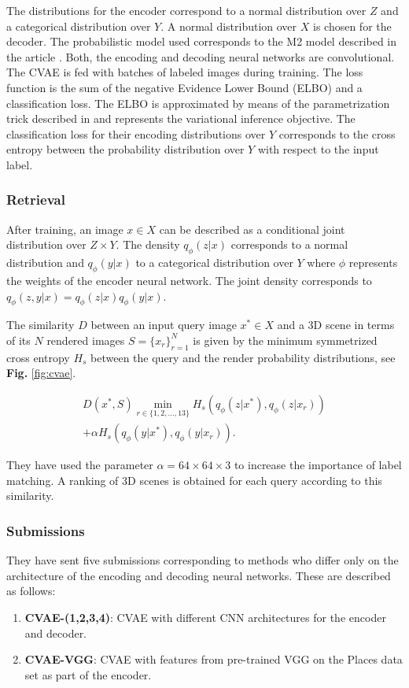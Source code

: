 \documentclass[../main.tex]{subfiles}
\begin{document}
The distributions for the encoder correspond to a normal distribution over $Z$ and a categorical distribution over $Y$. A normal distribution over $X$ is chosen for the decoder. The probabilistic model used corresponds to the M2 model described in the article \cite{Kingma2014a}. Both, the encoding and decoding neural networks are convolutional.\\

The CVAE is fed with batches of labeled images during training. The loss function is the sum of the negative Evidence Lower Bound (ELBO) and a classification loss. The ELBO is approximated by means of the parametrization trick described in \cite{Kingma2014a, kingma2013auto} and represents the variational inference objective. The classification loss for their encoding distributions over $Y$ corresponds to the cross entropy between the probability distribution over $Y$ with respect to the input label. 

\subsubsection{Retrieval}
After training, an image $x\in X$ can be described as a conditional joint distribution over $Z\times Y$. The density $q_\phi(z|x)$ corresponds to a normal distribution and $q_\phi(y|x)$ to a categorical distribution over $Y$ where $\phi$ represents the weights of the encoder neural network. The joint density corresponds to $q_\phi(z,y|x) = q_\phi(z|x) q_\phi(y|x)$.

The similarity $D$ between an input query image $x^*\in X$ and a 3D scene in terms of its $N$ rendered images $S = \{x_r\}_{r=1}^{N}$ is given by the minimum symmetrized cross entropy $H_s$ between the query and the render probability distributions, see \textbf{Fig.} \ref{fig:cvae}.

\begin{multline}
 D(x^*, S)\min_{r\in\{1,2,\ldots,13\} }H_s(q_\phi(z|x^*),q_\phi(z|x_{r}))\\
+\alpha H_s(q_\phi(y|x^*),q_\phi(y|x_{r})).
\end{multline}

They have used the parameter $\alpha = 64\times 64 \times 3$ to increase the importance of label matching. A ranking of 3D scenes is obtained for each query according to this similarity.

\subsubsection{Submissions}
They have sent five submissions corresponding to methods who differ only on the architecture of the encoding and decoding neural networks. These are described as follows:
\begin{enumerate}
    \item \textbf{CVAE-(1,2,3,4)}: CVAE with different CNN architectures for the encoder and decoder.
    \item \textbf{CVAE-VGG}: CVAE with features from pre-trained VGG \cite{gkallia2017keras_places365} on the Places data set \cite{Places88} as part of the encoder.
    
\end{enumerate}
\end{document}
